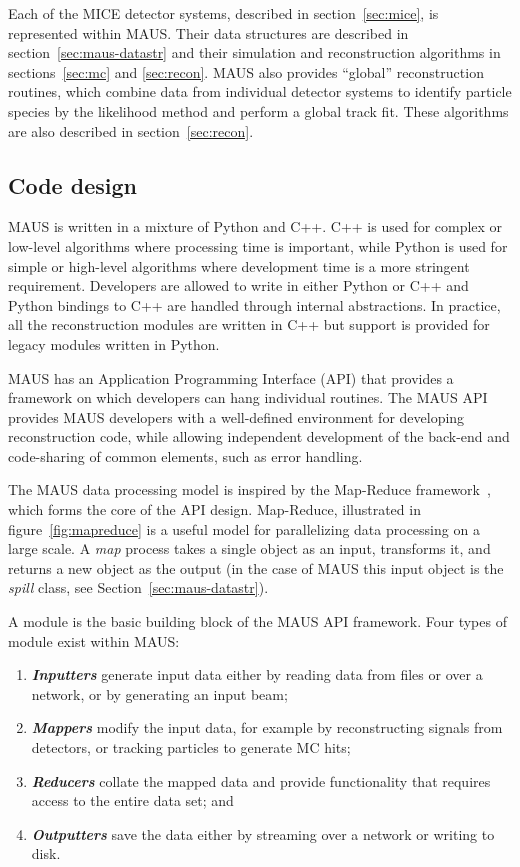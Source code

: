 \documentclass[11pt,a4paper]{article}
\begin{document}
Each of the MICE detector systems, described in section~\ref{sec:mice}, is represented within MAUS. Their data structures are described in section~\ref{sec:maus-datastr} and their simulation and reconstruction algorithms in sections~\ref{sec:mc} and \ref{sec:recon}. MAUS also provides ``global'' reconstruction routines, which combine data from individual detector systems to identify particle species by the likelihood method and perform a global track fit. These algorithms are also described in section~\ref{sec:recon}. 


\subsection{Code design}\label{sec:maus-arch}

MAUS is written in a mixture of Python and C++. C++ is used for complex or low-level algorithms where processing time is important, while Python is used for simple or high-level algorithms where development time is a more stringent requirement. Developers are allowed to write in either Python or C++ and Python bindings to C++ are handled through internal abstractions. In practice, all the reconstruction modules are written in C++ but support is provided for legacy modules written in Python.

MAUS has an Application Programming Interface (API) that provides a framework on which developers can hang individual routines. The MAUS API provides MAUS developers with a well-defined environment for developing reconstruction code, while allowing independent development of the back-end and code-sharing of common elements, such as error handling. 

The MAUS data processing model is inspired by the Map-Reduce framework~\cite{MapReduce}, which forms the core of the API design. Map-Reduce, illustrated in figure~\ref{fig:mapreduce} is a useful model for parallelizing data processing on a large scale. A \textit{map} process takes a single object as an input, transforms it, and returns a new object as the output (in the case of MAUS this input object is the \emph{spill} class, see Section~\ref{sec:maus-datastr}).

A module is the basic building block of the MAUS API framework. Four types of module exist within MAUS:

\begin{enumerate}
\item \textbf{\textit{Inputters}} generate input data either by reading data from files or over a network, or by generating an input beam;
\item \textbf{\textit{Mappers}} modify the input data, for example by reconstructing signals from detectors, or tracking  particles to generate MC hits;
\item \textbf{\textit{Reducers}} collate the mapped data and provide functionality that requires access to the entire data set; and
\item \textbf{\textit{Outputters}} save the data  either by streaming over a network or writing to disk.
\end{enumerate}
\end{document}
